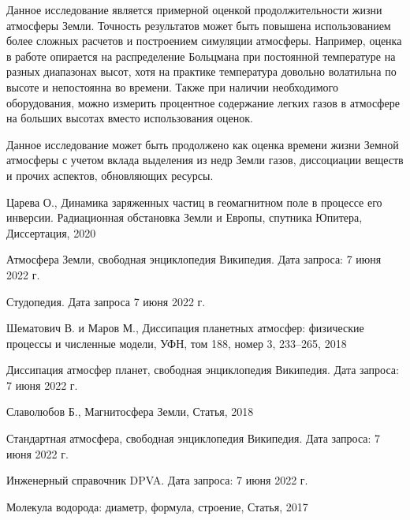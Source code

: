 \documentclass[12pt,a4paper]{article}
\begin{document}
Данное исследование является примерной оценкой продолжительности жизни атмосферы Земли.
Точность результатов может быть повышена использованием более сложных расчетов и построением симуляции атмосферы. Например, оценка в работе опирается на распределение Больцмана при постоянной температуре на разных диапазонах высот, хотя на практике температура довольно волатильна по высоте и непостоянна во времени.
Также при наличии необходимого оборудования, можно измерить процентное содержание легких газов в атмосфере на больших высотах вместо использования оценок.

Данное исследование может быть продолжено как оценка времени жизни Земной атмосферы с учетом вклада выделения из недр Земли газов, диссоциации веществ и прочих аспектов, обновляющих ресурсы.

\newpage

\begin{thebibliography}{}
    Царева О., Динамика заряженных частиц в геомагнитном поле в процессе его инверсии. Радиационная обстановка Земли и Европы, спутника Юпитера, Диссертация, 2020
    
    Атмосфера Земли, свободная энциклопедия Википедия. Дата запроса: 7 июня 2022 г.

    Студопедия. Дата запроса 7 июня 2022 г.

    Шематович В. и Маров М., Диссипация планетных атмосфер: физические процессы и численные модели, УФН, том 188, номер 3, 233–265, 2018

    Диссипация атмосфер планет, свободная энциклопедия Википедия. Дата запроса: 7 июня 2022 г.

    Славолюбов Б., Магнитосфера Земли, Статья, 2018

    Стандартная атмосфера, свободная энциклопедия Википедия. Дата запроса: 7 июня 2022 г.

    Инженерный справочник DPVA. Дата запроса: 7 июня 2022 г. 

    Молекула водорода: диаметр, формула, строение, Статья, 2017 

\end{thebibliography}
\end{document}
